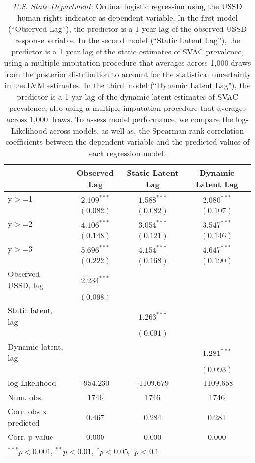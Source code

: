 
\begin{table}[h]
\begin{center}
\begin{tabular}{l c c c }
\hline
 & Observed Lag & Static Latent Lag & Dynamic Latent Lag \\
\hline
y$>$=1                & $2.109^{***}$ & $1.588^{***}$ & $2.080^{***}$ \\
                      & $(0.082)$     & $(0.082)$     & $(0.107)$     \\
y$>$=2                & $4.106^{***}$ & $3.054^{***}$ & $3.547^{***}$ \\
                      & $(0.148)$     & $(0.121)$     & $(0.146)$     \\
y$>$=3                & $5.696^{***}$ & $4.154^{***}$ & $4.647^{***}$ \\
                      & $(0.222)$     & $(0.168)$     & $(0.190)$     \\
Observed USSD, lag    & $2.234^{***}$ &               &               \\
                      & $(0.098)$     &               &               \\
Static  latent, lag   &               & $1.263^{***}$ &               \\
                      &               & $(0.091)$     &               \\
Dynamic latent, lag   &               &               & $1.281^{***}$ \\
                      &               &               & $(0.093)$     \\
\hline
log-Likelihood        & -954.230      & -1109.679     & -1109.658     \\
Num. obs.             & 1746          & 1746          & 1746          \\
Corr. obs x predicted & 0.467         & 0.284         & 0.281         \\
Corr. p-value         & 0.000         & 0.000         & 0.000         \\
\hline
\multicolumn{4}{l}{\scriptsize{$^{***}p<0.001$, $^{**}p<0.01$, $^*p<0.05$, $^{\cdot}p<0.1$}}
\end{tabular}
\caption{\emph{U.S. State Department}: Ordinal logistic regression using the USSD human rights 
       indicator as dependent variable. In the first model (``Observed Lag''), the predictor is a 1-year lag
       of the observed USSD response variable. In the second model (``Static Latent Lag''), the predictor is a 1-year
       lag of the static estimates of SVAC prevalence, using a multiple imputation procedure that averages across 1,000 draws
        from the posterior distribution to account for the statistical uncertainty in the LVM estimates. 
       In the third model (``Dynamic Latent Lag''), the predictor is a 1-yar lag of the dynamic latent 
       estimates of SVAC prevalence, also using a multiple imputation procedure that averages across 1,000 draws. To assess
       model performance, we compare the log-Likelihood across models, as well as, the Spearman rank
       correlation coefficients between the dependent variable and the predicted values of each regression
       model.}
\label{xt-state}
\end{center}
\end{table}
